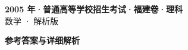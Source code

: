 \documentclass[zihao=-4, a4paper]{ctexart}
\begin{document}
\begin{center}
  {\Large\bfseries 2005 年·普通高等学校招生考试·福建卷·理科}\\[4pt]
  {\large 数学 · 解析版}
\end{center}
\medskip
{}

\clearpage
{}
\begin{center}{\Large\bfseries 参考答案与详细解析}\end{center}
\medskip

\end{document}
